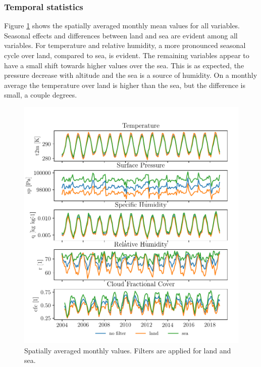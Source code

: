 \subsubsection{Temporal statistics}
Figure \ref{fig:monthly_mean_ts_vars} shows the spatially averaged monthly mean values for all variables. Seasonal effects and differences between land and sea are evident among all variables. For temperature and relative humidity, a more pronounced seasonal cycle over land, compared to sea, is evident. The remaining variables appear to have a small shift towards higher values over the sea. This is as expected, the pressure decrease with altitude and the sea is a source of humidity. On a monthly average the temperature over land is higher than the sea, but the difference is small, a couple degrees.
\begin{figure}[ht]
    \centering
    \includegraphics{python_figs/monthly_means.pdf}
    \caption{Spatially averaged monthly values. Filters are applied for land and sea.}
    \label{fig:monthly_mean_ts_vars}
\end{figure}

